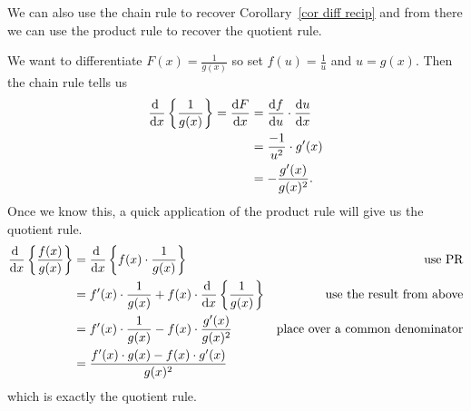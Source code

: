 \begin{eg}
 We can also use the chain rule to recover Corollary~\ref{cor diff recip} and from there
we can use the product rule to recover the quotient rule.

We want to differentiate $F(x) = \frac{1}{g(x)}$ so set $f(u) = \frac{1}{u}$ and
$u=g(x)$. Then the chain rule tells us
\begin{align*}
  \diff{}{x} \left\{\frac{1}{g(x)}\right\} = \diff{F}{x}
&= \diff{f}{u} \cdot \diff{u}{x} \\
  &= \frac{-1}{u^2} \cdot g'(x) \\
  &= -\frac{g'(x)}{g(x)^2}.
\end{align*}
Once we know this, a quick application of the product rule will give us the quotient rule.
\begin{align*}
\diff{}{x} \left\{ \frac{f(x)}{g(x)} \right\}
&= \diff{}{x} \left\{ f(x) \cdot \frac{1}{g(x)}  \right\} & \text{use PR}\\
&= f'(x)\cdot \frac{1}{g(x)}  + f(x) \cdot \diff{}{x} \left\{\frac{1}{g(x)}\right\} &
\text{use the result from above} \\
&= f'(x)\cdot \frac{1}{g(x)}  - f(x) \cdot \frac{g'(x)}{g(x)^2} &
\text{place over a common denominator}\\
 &= \frac{f'(x) \cdot g(x) - f(x) \cdot g'(x)}{g(x)^2}
\end{align*}
which is exactly the quotient rule.
\end{eg}


